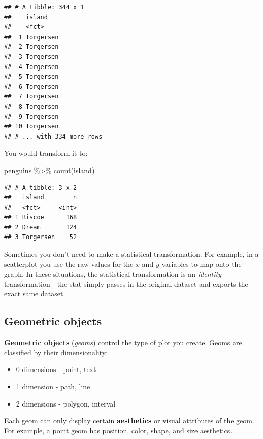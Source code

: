 \documentclass[
]{article}
\newenvironment{Shaded}{\begin{snugshade}}{\end{snugshade}}
\newcommand{\FunctionTok}[1]{\textcolor[rgb]{0.00,0.00,0.00}{#1}}
\newcommand{\NormalTok}[1]{#1}
\newcommand{\SpecialCharTok}[1]{\textcolor[rgb]{0.00,0.00,0.00}{#1}}
\providecommand{\tightlist}{%
  \setlength{\itemsep}{0pt}\setlength{\parskip}{0pt}}
\begin{document}
\begin{verbatim}
## # A tibble: 344 x 1
##    island   
##    <fct>    
##  1 Torgersen
##  2 Torgersen
##  3 Torgersen
##  4 Torgersen
##  5 Torgersen
##  6 Torgersen
##  7 Torgersen
##  8 Torgersen
##  9 Torgersen
## 10 Torgersen
## # ... with 334 more rows
\end{verbatim}

You would transform it to:

\begin{Shaded}
\begin{Highlighting}[]
\NormalTok{penguins }\SpecialCharTok{\%\textgreater{}\%}
  \FunctionTok{count}\NormalTok{(island)}
\end{Highlighting}
\end{Shaded}

\begin{verbatim}
## # A tibble: 3 x 2
##   island        n
##   <fct>     <int>
## 1 Biscoe      168
## 2 Dream       124
## 3 Torgersen    52
\end{verbatim}

Sometimes you don't need to make a statistical transformation. For
example, in a scatterplot you use the raw values for the \(x\) and \(y\)
variables to map onto the graph. In these situations, the statistical
transformation is an \emph{identity} transformation - the stat simply
passes in the original dataset and exports the exact same dataset.

\hypertarget{geometric-objects}{%
\subsection{Geometric objects}\label{geometric-objects}}

\textbf{Geometric objects} (\emph{geoms}) control the type of plot you
create. Geoms are classified by their dimensionality:

\begin{itemize}
\tightlist
\item
  0 dimensions - point, text
\item
  1 dimension - path, line
\item
  2 dimensions - polygon, interval
\end{itemize}

Each geom can only display certain \textbf{aesthetics} or visual
attributes of the geom. For example, a point geom has position, color,
shape, and size aesthetics.
\end{document}
